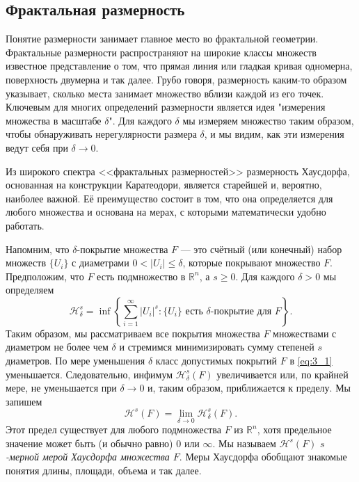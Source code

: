 \documentclass[a4paper,14pt]{extarticle} %
\newcommand{\cH}{\mathcal{H}}
\newcommand{\rr}{\mathbb{R}}
\newcommand{\0}{\varnothing}
\newcommand{\8}{\infty}
\theoremstyle{definition}
\begin{document}
\subsection{Фрактальная размерность}

Понятие размерности занимает главное место во фрактальной геометрии. 
Фрактальные размерности распространяют на широкие классы множеств известное представление о том, что прямая линия или гладкая кривая одномерна, поверхность двумерна и так далее. 
Грубо говоря, размерность каким-то образом указывает, сколько места занимает множество вблизи каждой из его точек. 
Ключевым для многих определений размерности является идея "измерения множества в масштабе $\delta$". 
Для каждого $\delta$ мы измеряем множество таким образом, чтобы обнаруживать нерегулярности размера $\delta$, и мы видим, как эти измерения ведут себя при $\delta \rightarrow 0 $.

Из широкого спектра <<фрактальных размерностей>> размерность Хаусдорфа, основанная на конструкции Каратеодори, является старейшей и, вероятно, наиболее важной.
Её преимущество состоит в том, что она определяется для любого множества и основана на мерах, с которыми математически удобно работать.

Напомним, что $\delta$-покрытие множества $F$ --- это счётный (или конечный) набор множеств $\{U_i\}$ с диаметрами $0<|U_i|\leq\delta$, которые покрывают множество $F$.
Предположим, что $F$ есть подмножество в $\rr^n$, а $s\geq0$.
Для каждого $\delta>0$ мы определяем
\begin{equation}\label{eq:3_1}
    \cH_\delta^s=\inf\left\{\sum_{i=1}^\8|U_i|^s : \{U_i\} \text{ есть $\delta$-покрытие для } F\right\}.
\end{equation}
Таким образом, мы рассматриваем все покрытия множества $F$ множествами с диаметром не более чем $\delta$ и стремимся минимизировать сумму степеней $s$ диаметров.
По мере уменьшения $\delta$ класс допустимых покрытий $F$ в \eqref{eq:3_1} уменьшается.
Следовательно, инфимум $\cH_\delta^s(F)$ увеличивается или, по крайней мере, не уменьшается при $\delta\to0$ и, таким образом, приближается к пределу.
Мы запишем
\begin{equation}\label{eq:3_2}
    \cH^s(F)=\lim_{\delta\to0}\cH_\delta^s(F).
\end{equation}
Этот предел существует для любого подмножества $F$ из $\rr^n$, хотя предельное значение может быть (и обычно равно) $0$ или $\8$.
Мы называем $\cH^s(F)$ {\em $s$-мерной мерой Хаусдорфа множества $F$}.
Меры Хаусдорфа обобщают знакомые понятия длины, площади, объема и так далее.
\end{document}
